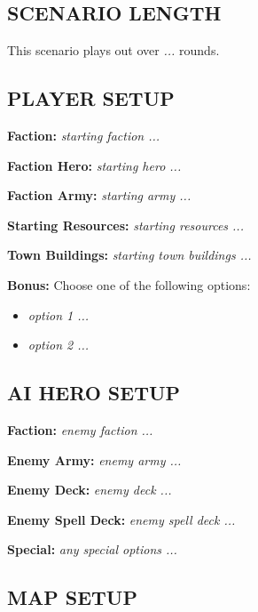 
\begin{multicols*}{2}

\subsection*{\MakeUppercase{Scenario length}}

This scenario plays out over \textit{...} rounds.

\subsection*{\MakeUppercase{Player setup}}

\textbf{Faction:} \textit{starting faction ...}

\textbf{Faction Hero:} \textit{starting hero ...}

\textbf{Faction Army:} \textit{starting army ...}

\textbf{Starting Resources:} \textit{starting resources ...}

\textbf{Town Buildings:} \textit{starting town buildings ...}

\textbf{Bonus:} Choose one of the following options: 

\begin{itemize}
    \item \textit{option 1 ...}
    \item \textit{option 2 ...}
\end{itemize}

\subsection*{\MakeUppercase{AI hero setup}}

\textbf{Faction:} \textit{enemy faction ...}

\textbf{Enemy Army:} \textit{enemy army ...}

\textbf{Enemy Deck:} \textit{enemy deck ...}

\textbf{Enemy Spell Deck:} \textit{enemy spell deck ...}

\textbf{Special:} \textit{any special options ...}

\subsection*{\MakeUppercase{Map setup}}


\end{multicols*}
